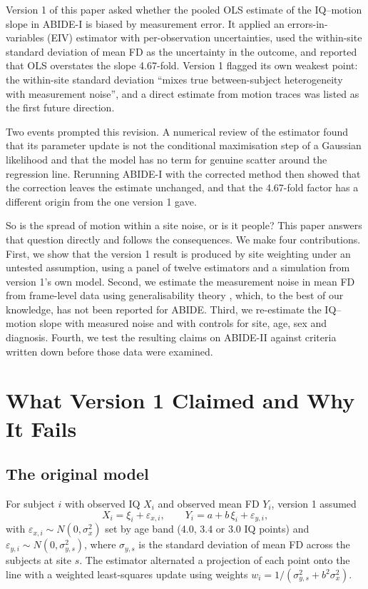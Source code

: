\documentclass[11pt,a4paper]{article}
\newcommand{\sx}{\sigma_{x}}
\begin{document}
Version 1 of this paper \citep{Soliman2026v1} asked whether the pooled OLS estimate of the IQ--motion slope in ABIDE-I \citep{DiMartino2014} is biased by measurement error. It applied an errors-in-variables (EIV) estimator with per-observation uncertainties, used the within-site standard deviation of mean FD as the uncertainty in the outcome, and reported that OLS overstates the slope 4.67-fold. Version 1 flagged its own weakest point: the within-site standard deviation ``mixes true between-subject heterogeneity with measurement noise'', and a direct estimate from motion traces was listed as the first future direction.

Two events prompted this revision. A numerical review of the estimator found that its parameter update is not the conditional maximisation step of a Gaussian likelihood and that the model has no term for genuine scatter around the regression line. Rerunning ABIDE-I with the corrected method then showed that the correction leaves the estimate unchanged, and that the 4.67-fold factor has a different origin from the one version 1 gave.

So is the spread of motion within a site noise, or is it people? This paper answers that question directly and follows the consequences. We make four contributions. First, we show that the version 1 result is produced by site weighting under an untested assumption, using a panel of twelve estimators and a simulation from version 1's own model. Second, we estimate the measurement noise in mean FD from frame-level data using generalisability theory \citep{Brennan2001}, which, to the best of our knowledge, has not been reported for ABIDE. Third, we re-estimate the IQ--motion slope with measured noise and with controls for site, age, sex and diagnosis. Fourth, we test the resulting claims on ABIDE-II \citep{DiMartino2017} against criteria written down before those data were examined.

\section{What Version 1 Claimed and Why It Fails}

\subsection{The original model}

For subject $i$ with observed IQ $X_i$ and observed mean FD $Y_i$, version 1 assumed
\begin{equation}
X_i = \xi_i + \varepsilon_{x,i}, \qquad Y_i = a + b\,\xi_i + \varepsilon_{y,i},
\end{equation}
with $\varepsilon_{x,i} \sim N(0, \sx^2)$ set by age band (4.0, 3.4 or 3.0 IQ points) and $\varepsilon_{y,i} \sim N(0, \sigma_{y,s}^2)$, where $\sigma_{y,s}$ is the standard deviation of mean FD across the subjects at site $s$. The estimator alternated a projection of each point onto the line with a weighted least-squares update using weights $w_i = 1/(\sigma_{y,s}^2 + b^2 \sx^2)$.
\end{document}
